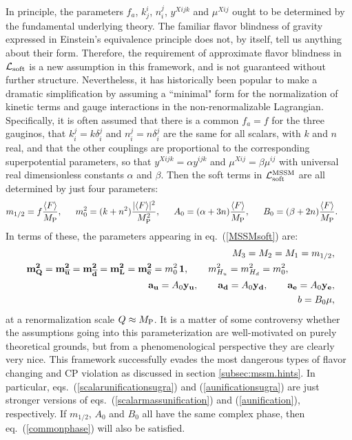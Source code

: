 \documentclass[11pt]{article}
\def\beq{\begin{eqnarray}}
\def\eeq{\end{eqnarray}}
\def\sbar{\overline}
\def\lagr{{\cal L}}
\def\MPlanck{M_{\rm P}}
\def\FX{F}
\begin{document}
In principle, the parameters $f_a$, $k^i_j$, $n_i^j$, $y^{Xijk}$ and $\mu^{Xij}$ 
ought to be 
determined by the fundamental underlying theory. The familiar flavor 
blindness of 
gravity expressed in Einstein's equivalence principle does not, by 
itself, tell us anything about their form.
Therefore, the requirement of approximate flavor blindness 
in ${\cal L}_{\rm soft}$ is a new 
assumption in this framework, and is not guaranteed without further 
structure. Nevertheless, it has 
historically been popular to make a dramatic simplification by assuming a 
``minimal" form for the normalization of kinetic terms and gauge 
interactions in the non-renormalizable Lagrangian. 
Specifically, it is often assumed that there is a common $f_a=f$ for the 
three gauginos, that $k_i^j = k \delta_i^j$ and $n_i^j = n \delta_i^j$ 
are the same for all scalars, with $k$ and $n$ real,
and that the other couplings are proportional to the corresponding 
superpotential parameters, so that $y^{Xijk} = \alpha y^{ijk}$ and 
$\mu^{Xij} = \beta \mu^{ij}$ with universal real dimensionless constants 
$\alpha$ and $\beta$. Then the soft terms in $\lagr_{\rm soft}^{\rm MSSM}$ 
are all determined by just four parameters:
\beq
m_{1/2} = f{\langle \FX \rangle\over \MPlanck},\qquad\!\!\!
m^2_{0} = (k + n^2) {|\langle \FX \rangle|^2\over \MPlanck^2},\qquad\!\!\!
A_0 = (\alpha + 3n){\langle \FX \rangle\over \MPlanck},\qquad\!\!\!
B_0 = (\beta + 2 n) {\langle \FX \rangle\over \MPlanck}.\>\>\phantom{xx}
\label{sillyassumptions}
\eeq
In terms of these, the parameters appearing in
eq.~(\ref{MSSMsoft}) are:
\beq
&&\!\!\!\! M_3 = M_2 = M_1 = m_{1/2},
\label{gauginounificationsugra}
\\
&&\!\!\!\! {\bf m^2_{Q}} =
{\bf m^2_{{\sbar u}}} =
{\bf m^2_{{\sbar d}}} =
{\bf m^2_{ L}} =
{\bf m^2_{{\sbar e}}} =
m_0^2\, {\bf 1},
\>\>\>\>\>\>\>\> \> m_{H_u}^2 = m^2_{H_d} = m_0^2, \>\>\>\qquad\qquad{}
\label{scalarunificationsugra}
\\
&&\!\!\!\! {\bf a_u} = A_0 {\bf y_u},\qquad
{\bf a_d} = A_0 {\bf y_d},\qquad
{\bf a_e} = A_0 {\bf y_e},
\label{aunificationsugra}
\\
&&\!\!\!\! b = B_0 \mu ,
\label{bsilly}
\eeq
at a renormalization scale $Q \approx \MPlanck$. It is a matter of some 
controversy whether the assumptions going into this parameterization are 
well-motivated on purely theoretical grounds, but from 
a phenomenological perspective they are clearly very nice. This framework 
successfully evades the most dangerous types of flavor changing and CP 
violation as discussed in section \ref{subsec:mssm.hints}. In particular, 
eqs.~(\ref{scalarunificationsugra}) and (\ref{aunificationsugra}) are just 
stronger versions of eqs.~(\ref{scalarmassunification}) and 
(\ref{aunification}), respectively. If $m_{1/2}$, $A_0$ and $B_0$ all have 
the same complex phase, then eq.~(\ref{commonphase}) will also be 
satisfied.
\end{document}
